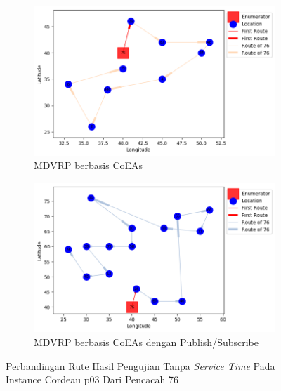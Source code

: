 \begin{figure}[H]
	\centering
	\begin{subfigure}[t]{\textwidth}
		\centering
		\includegraphics[width=\textwidth]{Resources/Images/cordeau_p03/cordeau_p03_notw_76_coes}
		\caption{MDVRP berbasis CoEAs}
		\label{fig:cordeau_p03_notw_76_coes}
	\end{subfigure}
	\begin{subfigure}[t]{\textwidth}
		\centering
		\includegraphics[width=\textwidth]{Resources/Images/cordeau_p03/cordeau_p03_notw_76_pubsub_coes}
		\caption{MDVRP berbasis CoEAs dengan Publish/Subscribe}
		\label{fig:cordeau_p03_notw_76_pubsub_coes}
	\end{subfigure}
	\caption{Perbandingan Rute Hasil Pengujian Tanpa \textit{Service Time} Pada Instance Cordeau p03 Dari Pencacah 76}
	\label{fig:cordeau_p03_notw_76}
\end{figure}


